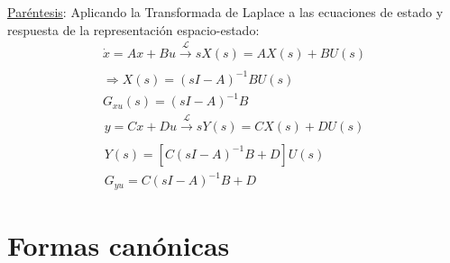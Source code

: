 \underline{Paréntesis}:
Aplicando la Transformada de Laplace a las ecuaciones de estado y respuesta de la representación espacio-estado:
\begin{align*}
    {\dot{x}}={A}{x}+{B}{u}\xrightarrow[]{\mathcal{L}}s{X}(s)={A}{X}(s)+{B}{U}(s)\\
    \Longrightarrow {X}(s)=(s{I}-{A})^{-1}{B}{U}(s)\\
    G_{xu}(s)=(s{I}-{A})^{-1}{B}
\end{align*}
\begin{align*}
    {y}={C}{x}+{D}{u}\xrightarrow[]{\mathcal{L}}s{Y}(s)={C}{X}(s)+{D}{U}(s)\\
    {Y}(s)=[{C}(s{I}-{A})^{-1}{B}+{D}]{U}(s)\\
    G_{yu}={C}(s{I}-{A})^{-1}{B}+{D}
\end{align*}


\section{Formas canónicas}
